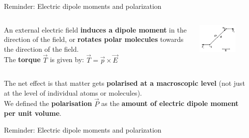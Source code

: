 {\begin{frame}{Reminder: Electric dipole moments and polarization}
\begin{columns}
  \begin{column}{0.60\textwidth}
    An external electric field {\bf induces a dipole moment} in the
    direction of the field, or {\bf rotates polar molecules}
    towards the direction of the field. \\
    \vspace{0.2cm}
    The {\bf torque} $\vec{T}$ is given by: $\vec{T} = \vec{p} \times \vec{E}$
  \end{column}
  \begin{column}{0.40\textwidth}
    \begin{center}
      \includegraphics[width=0.70\textwidth]{./images/schematics/electric_dipole_moment_torque.png}\\
    \end{center}
  \end{column}
\end{columns}

\vspace{0.2cm}
The net effect is that matter gets {\bf polarised at a macroscopic level}
(not just at the level of individual atoms or molecules).\\
\vspace{0.2cm}
We defined the {\bf polarisation} $\vec{P}$
as the {\bf amount of electric dipole moment per unit volume}.

\end{frame}

%
%
%

\begin{frame}{Reminder: Electric dipole moments and polarization}


\end{frame}}

